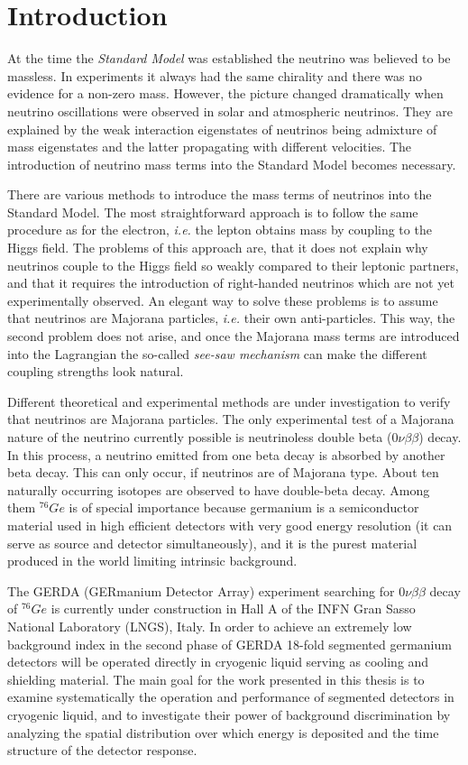 \chapter{Introduction}
\label{cha:intro}
At the time the \emph{Standard Model} was established the neutrino was believed to be massless. In experiments it always had the same chirality and there was no evidence for a non-zero mass. However, the picture changed dramatically when neutrino oscillations were observed in solar and atmospheric neutrinos. They are explained by the weak interaction eigenstates of neutrinos being admixture of mass eigenstates and the latter propagating with different velocities. The introduction of neutrino mass terms into the Standard Model becomes necessary.

There are various methods to introduce the mass terms of neutrinos into the Standard Model. The most straightforward approach is to follow the same procedure as for the electron, \textit{i.e.} the lepton obtains mass by coupling to the Higgs field. The problems of this approach are, that it does not explain why neutrinos couple to the Higgs field so weakly compared to their leptonic partners, and that it requires the introduction of right-handed neutrinos which are not yet experimentally observed. An elegant way to solve these problems is to assume that neutrinos are Majorana particles, \textit{i.e.} their own anti-particles. This way, the second problem does not arise, and once the Majorana mass terms are introduced into the Lagrangian the so-called \emph{see-saw mechanism} can make the different coupling strengths look natural.

Different theoretical and experimental methods are under investigation to verify that neutrinos are Majorana particles. The only experimental test of a Majorana nature of the neutrino currently possible is neutrinoless double beta ($0\nu\beta\beta$) decay. In this process, a neutrino emitted from one beta decay is absorbed by another beta decay. This can only occur, if neutrinos are of Majorana type. About ten naturally occurring isotopes are observed to have double-beta decay. Among them $^{76}Ge$ is of special importance because germanium is a semiconductor material used in high efficient detectors with very good energy resolution (it can serve as source and detector simultaneously), and it is the purest material produced in the world limiting intrinsic background.

The GERDA (GERmanium Detector Array) experiment \cite{Abt04, Sch05} searching for $0\nu\beta\beta$ decay of $^{76}Ge$ is currently under construction in Hall A of the INFN Gran Sasso National Laboratory (LNGS), Italy. In order to achieve an extremely low background index in the second phase of GERDA 18-fold segmented germanium detectors will be operated directly in cryogenic liquid serving as cooling and shielding material. The main goal for the work presented in this thesis is to examine systematically the operation and performance of segmented detectors in cryogenic liquid, and to investigate their power of background discrimination by analyzing the spatial distribution over which energy is deposited and the time structure of the detector response.

